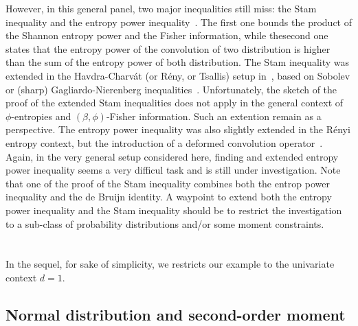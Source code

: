 \documentclass[english,sort&compress]{elsarticle}
\theoremstyle{definition}
\theoremstyle{plain}
\theoremstyle{plain}
\begin{document}
{  However, in  this general panel, two  major inequalities still  miss: the Stam
  inequality   and   the   entropy   power   inequality~\cite{Sta59,   DemCov91,
    CovTho06}. The first one bounds the product of the Shannon entropy power and
  the Fisher information,  while thesecond one states that  the entropy power of
  the convolution  of two  distribution is  higher than the  sum of  the entropy
  power  of  both  distribution.   The  Stam  inequality  was  extended  in  the
  Havdra-Charv\'at  (or R\'eny,  or Tsallis)  setup  in~\cite{LutYan05, LutLv12,
    Ber13,    Ber13:08,    Ber12:06_1},   based    on    Sobolev   or    (sharp)
  Gagliardo-Nierenberg inequalities~\cite{Agu08}.   Unfortunately, the sketch of
  the proof  of the  extended Stam  inequalities does not  apply in  the general
  context  of $\phi$-entropies and  $(\beta,\phi)$-Fisher information.   Such an
  extention  remain as  a perspective.   The entropy  power inequality  was also
  slightly extended  in the R\'enyi entropy  context, but the  introduction of a
  deformed  convolution operator~\cite{JohVig07}.   Again, in  the  very general
  setup considered here,  finding and extended entropy power  inequality seems a
  very difficul  task and  is still  under investigation. Note  that one  of the
  proof of the Stam inequality combines both the entrop power inequality and the
  de Bruijn  identity.  A waypoint to  extend both the  entropy power inequality
  and the Stam inequality should be to restrict the investigation to a sub-class
  of probability distributions and/or some moment constraints.  }


\appendix

\section{}
In  the  sequel,  for sake  of  simplicity,  we  restricts  our example  to  the
univariate context $d = 1$.


\subsection{Normal distribution and second-order moment}
\label{subsec:NormalSecondOrder}
\end{document}
